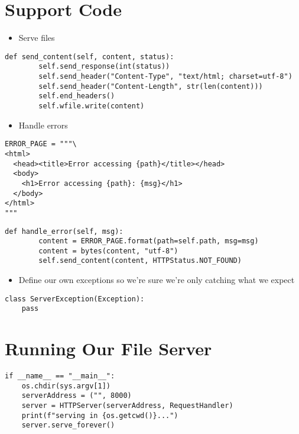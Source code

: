 \documentclass[krantzl]{krantz}
\begin{document}
\section{Support Code}
\begin{itemize}
\item Serve files

\end{itemize}
\begin{lstlisting}[frame=tblr]
    def send_content(self, content, status):
        self.send_response(int(status))
        self.send_header("Content-Type", "text/html; charset=utf-8")
        self.send_header("Content-Length", str(len(content)))
        self.end_headers()
        self.wfile.write(content)
\end{lstlisting}

\begin{itemize}
\item Handle errors

\end{itemize}
\begin{lstlisting}[frame=tblr]
ERROR_PAGE = """\
<html>
  <head><title>Error accessing {path}</title></head>
  <body>
    <h1>Error accessing {path}: {msg}</h1>
  </body>
</html>
"""
\end{lstlisting}

\begin{lstlisting}[frame=tblr]
    def handle_error(self, msg):
        content = ERROR_PAGE.format(path=self.path, msg=msg)
        content = bytes(content, "utf-8")
        self.send_content(content, HTTPStatus.NOT_FOUND)
\end{lstlisting}

\begin{itemize}
\item Define our own exceptions so we’re sure we’re only catching what we expect

\end{itemize}
\begin{lstlisting}[frame=tblr]
class ServerException(Exception):
    pass
\end{lstlisting}

\section{Running Our File Server}
\begin{lstlisting}[frame=tblr]
if __name__ == "__main__":
    os.chdir(sys.argv[1])
    serverAddress = ("", 8000)
    server = HTTPServer(serverAddress, RequestHandler)
    print(f"serving in {os.getcwd()}...")
    server.serve_forever()
\end{lstlisting}
\end{document}
